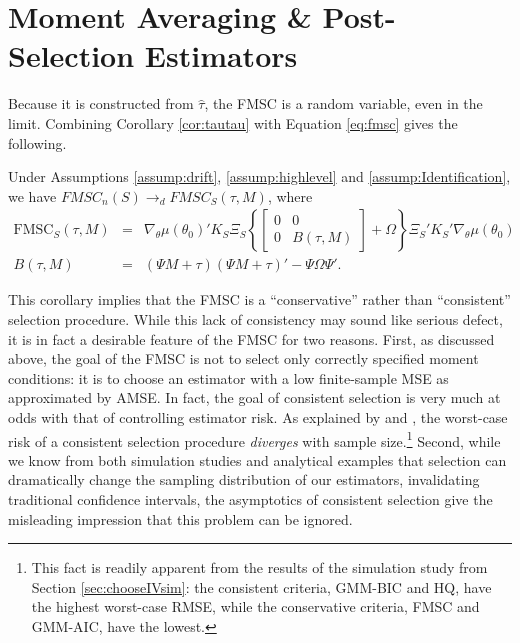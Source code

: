 \section{Moment Averaging \& Post-Selection Estimators}
\label{sec:avg}
Because it is constructed from $\widehat{\tau}$, the FMSC is a random variable, even in the limit.
Combining Corollary \ref{cor:tautau} with Equation \ref{eq:fmsc} gives the following.
\begin{cor}
\label{cor:FMSClimit}
	Under Assumptions \ref{assump:drift}, \ref{assump:highlevel} and \ref{assump:Identification}, we have $FMSC_n(S) \rightarrow_d FMSC_S(\tau, M)$, where
	\begin{eqnarray*}
		\mbox{FMSC}_S(\tau,M) &=& \nabla_\theta\mu(\theta_0)'K_S\Xi_S \left\{\left[\begin{array}{cc}0&0\\0& B(\tau,M) \end{array}\right] + \Omega\right\}\Xi_S'K_S'\nabla_\theta\mu(\theta_0)\\
		B(\tau,M) &=& (\Psi M + \tau)(\Psi M + \tau)' - \Psi \Omega \Psi'.
	\end{eqnarray*}
\end{cor}
This corollary implies that the FMSC is a ``conservative'' rather than ``consistent'' selection procedure.
While this lack of consistency may sound like serious defect, it is in fact a desirable feature of the FMSC for two reasons.
First, as discussed above, the goal of the FMSC is not to select only correctly specified moment conditions: it is to choose an estimator with a low finite-sample MSE as approximated by AMSE.
In fact, the goal of consistent selection is very much at odds with that of controlling estimator risk.
As explained by \cite{Yang2005} and \cite{LeebPoetscher2008}, the worst-case risk of a consistent selection procedure \emph{diverges} with sample size.\footnote{This fact is readily apparent from the results of the simulation study from Section \ref{sec:chooseIVsim}: the consistent criteria, GMM-BIC and HQ, have the highest worst-case RMSE, while the conservative criteria, FMSC and GMM-AIC, have the lowest.}
Second, while we know from both simulation studies \citep{Demetrescu} and analytical examples \citep{LeebPoetscher2005} that selection can dramatically change the sampling distribution of our estimators, invalidating traditional confidence intervals, the asymptotics of consistent selection give the misleading impression that this problem can be ignored.
